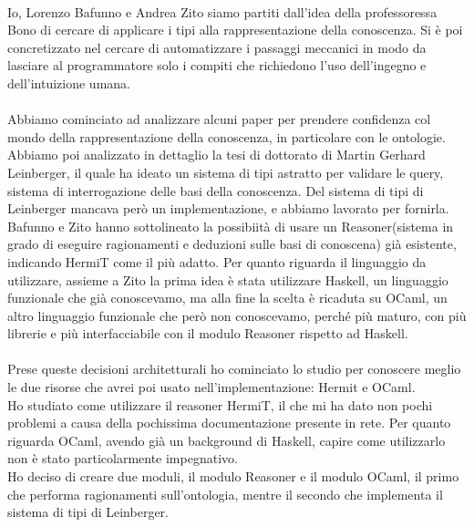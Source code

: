 \paragraph{} Io, Lorenzo Bafunno e Andrea Zito siamo partiti dall'idea della professoressa Bono di cercare di applicare i tipi alla rappresentazione della conoscenza. Si è poi concretizzato nel cercare di automatizzare i passaggi meccanici in modo da lasciare al programmatore solo i compiti che richiedono l'uso dell'ingegno e dell'intuizione umana.

\paragraph{} Abbiamo cominciato ad analizzare alcuni paper per prendere confidenza col mondo della rappresentazione della conoscenza, in particolare con le ontologie. Abbiamo poi analizzato in dettaglio la tesi di dottorato di Martin Gerhard Leinberger, il quale ha ideato un sistema di tipi astratto per validare le query, sistema di interrogazione delle basi della conoscenza. Del sistema di tipi di Leinberger mancava però un implementazione, e abbiamo lavorato per fornirla. Bafunno e Zito hanno sottolineato la possibiità di usare un Reasoner(sistema in grado di eseguire ragionamenti e deduzioni sulle basi di conoscena) già esistente, indicando HermiT come il più adatto. Per quanto riguarda il linguaggio da utilizzare, assieme a Zito la prima idea è stata utilizzare Haskell, un linguaggio funzionale che già conoscevamo, ma alla fine la scelta è ricaduta su OCaml, un altro linguaggio funzionale che però non conoscevamo, perché più maturo, con più librerie e più interfacciabile con il modulo Reasoner rispetto ad Haskell.

\paragraph{} Prese queste decisioni architetturali ho cominciato lo studio per conoscere meglio le due risorse che avrei poi usato nell'implementazione: Hermit e OCaml.\\
Ho studiato come utilizzare il reasoner HermiT, il che mi ha dato non pochi problemi  a causa della pochissima documentazione presente in rete. Per quanto riguarda OCaml, avendo già un background di Haskell, capire come utilizzarlo non è stato particolarmente impegnativo. \\
Ho deciso di creare due moduli, il modulo Reasoner e il modulo OCaml, il primo che performa ragionamenti sull'ontologia, mentre il secondo che implementa il sistema di tipi di Leinberger. 

